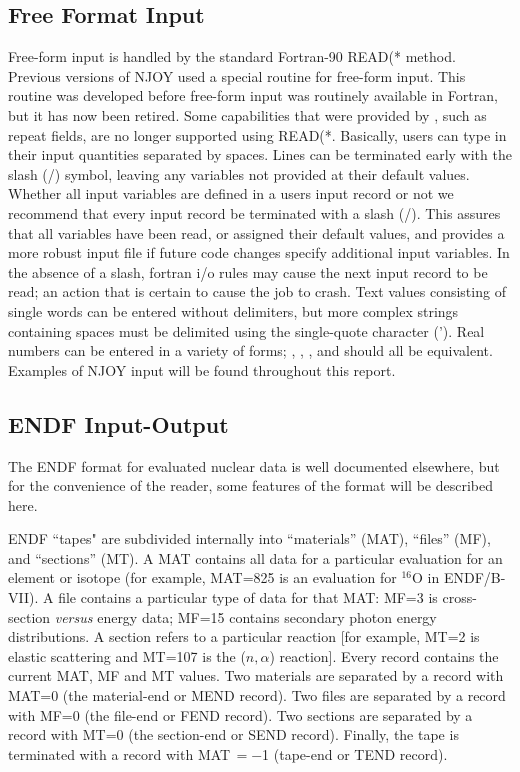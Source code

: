 \subsection{Free Format Input}
\label{ssNJOY_freeformat}

Free-form input is handled by the standard Fortran-90 READ(* method.
Previous versions of NJOY used a special routine  for
free-form input.  This routine was developed before free-form input
was routinely available in Fortran, but it has now been retired.  Some
capabilities that were provided by , such as repeat fields,
are no longer supported using READ(*.  Basically, users can type in
their input quantities separated by spaces.  Lines can be terminated
early with the slash (/) symbol, leaving any variables not provided
at their default values.  Whether all input variables are defined in
a users input record or not we recommend that every input record be
terminated with a slash (/).  This assures that all variables have
been read, or assigned their default values, and provides a more
robust input file if future code changes specify additional input
variables.  In the absence of a slash, fortran i/o rules may cause
the next input record to be read; an action that is certain to cause
the job to crash.  Text values consisting of single words
can be entered without delimiters, but more complex strings containing
spaces must be delimited using the single-quote character (').  Real
numbers can be entered in a variety of forms; , ,
, and  should all be equivalent.  Examples of
NJOY input will be found throughout this report.


\subsection{ENDF Input-Output}
\label{ssNJOY_ENDF_IO}

The ENDF format for evaluated nuclear data is well documented
elsewhere,\cite{ENDF102} but for the convenience of the reader,
some features of the format will be described here.

ENDF ``tapes" are subdivided internally into ``materials'' (MAT),
``files'' (MF), and ``sections'' (MT).  A MAT contains all data for
a particular evaluation for an element or isotope (for example, MAT=825
is an evaluation for $^{16}$O in ENDF/B-VII).  A file contains a
particular type of data for that MAT: MF=3 is cross-section
{\it versus} energy data; MF=15 contains secondary photon energy
distributions.   A section refers to a particular reaction [for
example, MT=2 is elastic scattering and MT=107 is the ($n,\alpha$)
reaction].  Every record contains the current MAT, MF and MT values.
Two materials are separated by a record with MAT=0 (the material-end
or MEND record).  Two files are separated by a record with MF=0 (the
file-end or FEND record).  Two sections are separated by a record
with MT=0 (the section-end or SEND record).  Finally, the tape is
terminated with a record with MAT$\,=-$1 (tape-end or TEND record).

